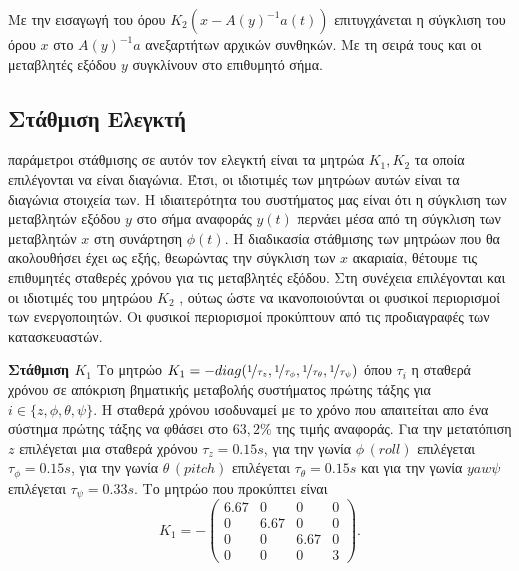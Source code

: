 Με την εισαγωγή του όρου $K_2(x - A(y)^{-1}a(t))$ επιτυγχάνεται η σύγκλιση του 
όρου $x$ στο $A(y)^{-1}a$ ανεξαρτήτων αρχικών συνθηκών. Με τη σειρά τους και οι 
μεταβλητές εξόδου $y$ συγκλίνουν στο επιθυμητό σήμα.

\subsection{Στάθμιση Ελεγκτή}
 παράμετροι στάθμισης σε αυτόν τον ελεγκτή είναι τα μητρώα 
$K_1, K_2$ τα οποία επιλέγονται να είναι διαγώνια. Έτσι, οι ιδιοτιμές των 
μητρώων αυτών είναι τα διαγώνια στοιχεία των. Η ιδιαιτερότητα του συστήματος 
μας είναι ότι η σύγκλιση των μεταβλητών εξόδου $y$ στο σήμα αναφοράς $y(t)$ 
περνάει μέσα από τη σύγκλιση των μεταβλητών $x$ στη συνάρτηση $\phi(t)$. Η 
διαδικασία στάθμισης των μητρώων που θα ακολουθήσει έχει ως εξής, θεωρώντας την 
σύγκλιση των $x$ ακαριαία, θέτουμε τις επιθυμητές σταθερές χρόνου για τις 
μεταβλητές εξόδου. Στη συνέχεια επιλέγονται και οι ιδιοτιμές του μητρώου $K_2$ 
, ούτως ώστε να ικανοποιούνται οι φυσικοί περιορισμοί των ενεργοποιητών. Οι 
φυσικοί περιορισμοί προκύπτουν από τις προδιαγραφές των κατασκευαστών.

\textbf{Στάθμιση $K_1$} Το μητρώο $K_1 = -diag(\nicefrac{1}{\tau_z}, 
\nicefrac{1}{\tau_\phi},\nicefrac{1}{\tau_\theta},\nicefrac{1}{\tau_\psi})$ όπου
$\tau_i$ η σταθερά χρόνου σε απόκριση βηματικής μεταβολής συστήματος πρώτης 
τάξης για $i \in \{z, \phi, \theta, \psi\}$. Η σταθερά χρόνου ισοδυναμεί με το 
χρόνο που απαιτείται απο ένα σύστημα πρώτης τάξης να φθάσει στο $63,2 \%$ της 
τιμής αναφοράς. Για την μετατόπιση $z$ επιλέγεται μια σταθερά χρόνου 
$\tau_z = 0.15s$, για την γωνία $\phi\,(roll)$ επιλέγεται $\tau_\phi = 0.15s$,
για την γωνία $\theta\,(pitch)$ επιλέγεται $\tau_\theta = 0.15s$ και για την 
γωνία $yaw \psi$ επιλέγεται $\tau_\psi = 0.33s$. Το μητρώο που προκύπτει είναι 
\begin{equation*}
    K_1 = -
    \begin{pmatrix}
        6.67 & 0    & 0    & 0\\
        0    & 6.67 & 0    & 0\\
        0    & 0    & 6.67 & 0\\
        0    & 0    & 0    & 3
    \end{pmatrix}.
\end{equation*}

